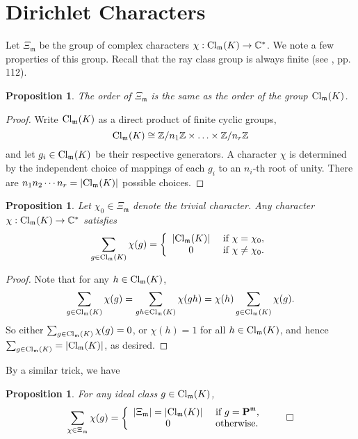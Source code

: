 \documentclass{amsart}
\def\ZZ{{\mathbb Z}}
\def\CC{{\mathbb C}}
\def\mf{\mathfrak}
\def\CC{\mathbb{C}}   %
\def\ZZ{\mathbb{Z}}
\def\Cl{\textnormal{Cl}}
\def\bP{\textbf{P}}
\newtheorem{proposition}[theorem]{Proposition}
\theoremstyle{definition}
\theoremstyle{remark}
\begin{document}
\section{Dirichlet Characters}

Let $\Xi_\mf{m}$ be the group of complex characters $\chi :
\Cl_\mf{m}(K) \to \CC^*$.  We note a few properties of this
group.  Recall that the ray class group is always finite (see
\cite{ANF}, pp. 112).

\begin{proposition}
The order of $\Xi_\mf{m}$ is the same as the order of the group
$\Cl_\mf{m}(K)$.
\end{proposition}
\begin{proof}
Write $\Cl_\mf{m}(K)$ as a direct product of finite cyclic groups,
\[
\Cl_\mf{m}(K) \cong \ZZ/n_1 \ZZ \times \ldots \times \ZZ / n_r \ZZ
\]
and let $g_i \in \Cl_\mf{m}(K)$ be their respective generators.  A
character $\chi$ is determined by the independent choice of
mappings of each $g_i$ to an $n_i$-th root of unity.  There are
$n_1n_2\cdots n_r = \left| \Cl_\mf{m}(K) \right|$ possible
choices.
\end{proof}

\begin{proposition}
\label{nontriv} Let $\chi_0 \in \Xi_\mf{m}$ denote the trivial
character. Any character $\chi : \Cl_\mf{m}(K) \to \CC^*$
satisfies
\[
\sum_{g \in \Cl_\mf{m}(K)} \chi(g) = \left\{ \begin{array}{cl}
\left| \Cl_\mf{m}(K) \right| & \textnormal{ if } \chi = \chi_0, \\
0 & \textnormal{ if } \chi \neq \chi_0.
\end{array} \right.
\]
\end{proposition}
\begin{proof}
Note that for any $h \in \Cl_\mf{m}(K)$,
\[
\sum_{g \in \Cl_\mf{m}(K)} \chi(g) = \sum_{gh \in \Cl_\mf{m}(K)}
\chi(gh) = \chi(h) \sum_{g \in \Cl_\mf{m}(K)} \chi(g).
\]
So either $\sum_{g \in \Cl_\mf{m}(K)} \chi(g) = 0$, or $\chi(h) =
1$ for all $h \in \Cl_\mf{m}(K)$, and hence $\sum_{g \in
\Cl_\mf{m}(K)} = \left| \Cl_\mf{m}(K) \right|$, as desired.
\end{proof}

By a similar trick, we have

\begin{proposition}
\label{sumchar} For any ideal class $g \in \Cl_\mf{m}(K)$,
\[
\sum_{\chi \in \Xi_\mf{m}} \chi(g) = \left\{
\begin{array}{cl} \left| \Xi_\mf{m} \right| =
\left| \Cl_\mf{m}(K) \right| & \textnormal{ if } g = \bP^\mf{m}, \\
0 & \textnormal{ otherwise.}
\end{array} \right.  \qed
\]
\end{proposition}
\end{document}
